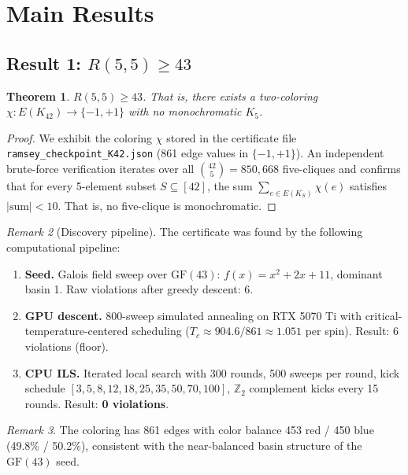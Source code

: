 \documentclass[11pt,a4paper]{article}
\theoremstyle{plain}
\newtheorem{theorem}{Theorem}[section]
\theoremstyle{remark}
\newtheorem{remark}[theorem]{Remark}
\newcommand{\GF}{\mathrm{GF}}
\begin{document}
\section{Main Results}

\subsection{Result 1: $R(5,5) \geq 43$}

\begin{theorem}\label{thm:r55-lower}
$R(5,5) \geq 43$. That is, there exists a two-coloring
$\chi: E(K_{42}) \to \{-1, +1\}$ with no monochromatic $K_5$.
\end{theorem}

\begin{proof}
We exhibit the coloring $\chi$ stored in the certificate file
\texttt{ramsey\_checkpoint\_K42.json} (861 edge values in
$\{-1,+1\}$). An independent brute-force verification iterates
over all $\binom{42}{5} = 850{,}668$ five-cliques and confirms
that for every 5-element subset $S \subseteq [42]$, the sum
$\sum_{e \in E(K_S)} \chi(e)$ satisfies $|\text{sum}| < 10$.
That is, no five-clique is monochromatic.
\end{proof}

\begin{remark}[Discovery pipeline]
The certificate was found by the following computational pipeline:
\begin{enumerate}[leftmargin=2em]
  \item \textbf{Seed.} Galois field sweep over $\GF(43)$:
    $f(x) = x^2 + 2x + 11$, dominant basin 1.
    Raw violations after greedy descent: 6.
  \item \textbf{GPU descent.} 800-sweep simulated annealing on
    RTX 5070 Ti with critical-temperature-centered scheduling
    ($T_c \approx 904.6 / 861 \approx 1.051$ per spin).
    Result: 6 violations (floor).
  \item \textbf{CPU ILS.} Iterated local search with 300 rounds,
    500 sweeps per round, kick schedule
    $[3, 5, 8, 12, 18, 25, 35, 50, 70, 100]$,
    $\mathbb{Z}_2$ complement kicks every 15 rounds.
    Result: \textbf{0 violations}.
\end{enumerate}
\end{remark}

\begin{remark}
The coloring has 861 edges with color balance 453 red / 450 blue
(49.8\% / 50.2\%), consistent with the near-balanced basin
structure of the $\GF(43)$ seed.
\end{remark}
\end{document}
